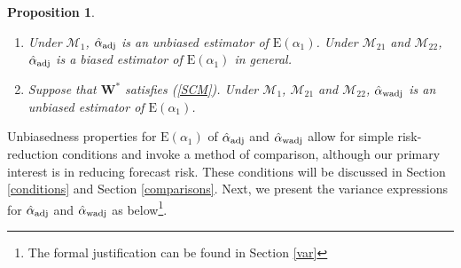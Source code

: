 \documentclass[11pt]{article}
\def\mbf#1{\mathbf{#1}} %
\def\mc#1{\mathcal{#1}} %
\def\E#1{\mathrm{E}(#1)} %
\newtheorem{prop}{Proposition}
\theoremstyle{definition}
\begin{document}
\begin{prop}
\label{unbiased} 
\quad 
\begin{enumerate}[label = (\roman*)]
  \item Under $\mc{M}_1$, $\hat{\alpha}_{\rm adj}$ is an unbiased estimator of $\E{\alpha_1}$. Under $\mc{M}_{21}$ and $\mc{M}_{22}$, $\hat{\alpha}_{\rm adj}$ is a biased estimator of $\E{\alpha_1}$ in general.
  \item Suppose that $\mbf{W}^*$ satisfies (\ref{SCM}). Under $\mc{M}_{1}$, $\mc{M}_{21}$ and $\mc{M}_{22}$, $\hat{\alpha}_{\rm wadj}$ is an unbiased estimator of $\E{\alpha_1}$.
\end{enumerate}
\end{prop}


Unbiasedness properties for $\E{\alpha_1}$ of $\hat{\alpha}_{\rm adj}$ and $\hat{\alpha}_{\rm wadj}$ allow for simple risk-reduction conditions and invoke a method of comparison, although our primary interest is in reducing forecast risk. %
These conditions will be discussed in Section \ref{conditions} and Section \ref{comparisons}. Next, we present the variance expressions for $\hat{\alpha}_{\rm adj}$ and $\hat{\alpha}_{\rm wadj}$ as below\footnote{The formal justification can be found in Section \ref{var}}.
\end{document}
